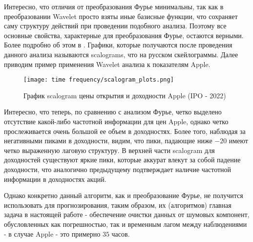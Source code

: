 Интересно, что отличия от преобразования Фурье минимальны, так как в преобразовании Wavelet просто взяты иные базисные функции, что сохраняет саму структуру действий при проведении подобного анализа. Поэтому все основные свойства, характерные для преобразования Фурье, остаются верными. Более подробно об этом в \cite{brunton2022data}. Графики, которые получаются после проведения данного анализа называются scalograms, что на русском скейлограммы. Далее приводим пример применения Wavelet анализа к показателям Apple.
\begin{figure}[H]
	\centering
	\texttt{[image: time frequency/scalogram\_plots.png]}
	\caption{График scalogram цены открытия и доходности Apple (IPO - 2022)}
	\label{fig::wavelet_example}
\end{figure}
Интересно, что теперь, по сравнению с анализом Фурье, четко выделено отсутствие какой-либо частотной информации для цен Apple, однако четко прослеживается очень большой ее объем в доходностях. Более того, наблюдая за негативными пиками в доходности, видим, что пики, падающие ниже $-20$ имеют четко выраженную лаговую структуру. В верхней части scalogram для доходностей существуют яркие пики, которые аккурат влекут за собой падение доходности, что аналогично предыдущему подтверждает наличие частотной информации в доходностях акций.

Однако конкретно данный алгоритм, как и преобразование Фурье, не получится использовать для прогнозирования, таким образом, их (алгоритмов) главная задача в настоящей работе - обеспечение очистки данных от шумовых компонент, обусловленных как погрешностью, так и временным лагом между наблюдениями - в случае Apple - это примерно $35$ часов.


